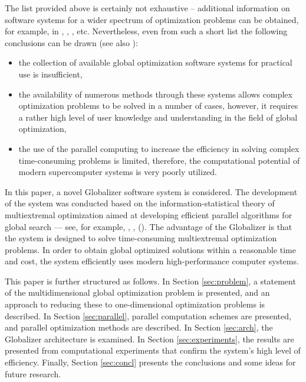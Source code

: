 \documentclass{gOMS2e}
\theoremstyle{plain}%
\theoremstyle{definition}
\theoremstyle{remark}
\begin{document}
\par
The list provided above is certainly not exhaustive – additional information on software
systems for a wider spectrum of optimization problems can be obtained, for example,
in \cite{riosSahinidis2013}, \cite{mongeauKarsentyRouze2000}, \cite{pinter2009}, etc.
Nevertheless, even from such a short list the following conclusions can be drawn (see also \cite{liberti2009}):
\begin{itemize}
\item  the collection of available global optimization software systems for practical use is insufficient,
\item the availability of numerous methods through these systems allows complex
optimization problems to be solved in a number of cases, however, it requires a rather
high level of user knowledge and understanding in the field of global optimization,
\item the use of the parallel computing to increase the efficiency in solving complex
time-consuming problems is limited, therefore, the computational potential of modern
supercomputer systems is very poorly utilized.
\end{itemize}
\par
In this paper, a novel Globalizer software system is considered. The development of the
system was conducted based on the information-statistical theory of multiextremal
optimization aimed at developing efficient parallel algorithms for global search --- see, for example, \cite{strongin1978}, \cite{strSergGO}, (\cite{stronginGergelBarkalovParGO}).
The advantage of the Globalizer is that the system is designed to solve time-consuming
multiextremal optimization problems. In order to obtain global optimized solutions
within a reasonable time and cost, the system efficiently uses modern high-performance computer systems.
\par
This paper is further structured as follows. In Section \ref{sec:problem}, a statement of the multidimensional
global optimization problem is presented, and an approach to reducing these to one-dimensional
optimization problems is described. In Section \ref{sec:parallel}, parallel computation schemes are presented,
and parallel optimization methods are described. In Section \ref{sec:arch}, the Globalizer architecture
is examined. In Section \ref{sec:experiments}, the results are presented from computational experiments
that confirm the system’s high level of efficiency. Finally, Section \ref{sec:concl} presents the
conclusions and some ideas for future research.
\end{document}
